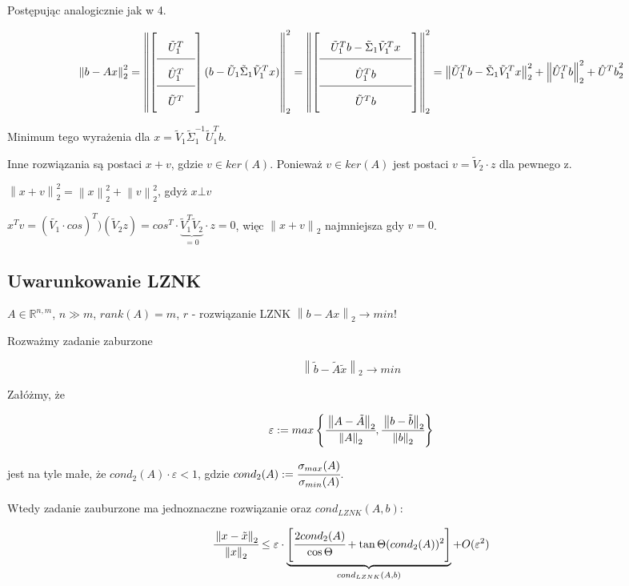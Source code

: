 \documentclass[hidelinks,a4paper]{article}
\newcommand{\RR}{\mathbb{R}}
\newcommand{\ra}{\rightarrow}
\newcommand{\norm}[1]{\left\lVert#1\right\rVert}
\begin{document}
Postępując analogicznie jak w 4.

\[\arraycolsep=1em\def\arraystretch{2}
\norm{b - Ax}_2^2 = \norm{\left[ \begin{array}{c}
\tilde{U}_1^T \\ \hline
\hat{U}_1^T \\ \hline
\tilde{U}^T 
\end{array}\right] (b - \tilde{U}_1 \tilde{\Sigma}_1 \tilde{V}_1^Tx)}_2^2 = \norm{\left[\begin{array}{c}
\tilde{U}_1^Tb - \tilde{\Sigma}_1\tilde{V}_1^Tx \\ \hline
\hat{U}_1^T b\\ \hline
\tilde{U}^T b 
\end{array}\right]}_2^2 = 
\norm{\tilde{U}_1^Tb - \tilde{\Sigma}_1\tilde{V}_1^Tx}_2^2 +  \norm{\hat{U}_1^Tb}_2^2 + {\hat{U}^Tb}_2^2
\]

Minimum tego wyrażenia dla $x = \tilde{V}_1\tilde{\Sigma}_1^{-1} \tilde{U}_1^Tb$.

Inne rozwiązania są postaci $x+v$, gdzie $v \in ker(A)$. Ponieważ $v \in ker(A)$ jest postaci $v = \tilde{V}_2 \cdot z$ dla pewnego z.

$\norm{x + v}_2^2 = \norm{x}_2^2 + \norm{v}_2^2$, gdyż $x \bot v$

$x^Tv = (\tilde{V_1} \cdot cos)^T) (\tilde{V}_2z) = cos^T \cdot \underbrace{\tilde{V}_1^T\tilde{V}_2}_{=0}\cdot z = 0$, więc $\norm{x + v}_2$ najmniejsza gdy $v = 0$.

\subsection{Uwarunkowanie LZNK}

$A \in \RR^{n,m}$, $n \gg m$, $rank(A) = m$, $r$ - rozwiązanie LZNK $\norm{b - Ax}_2 \ra min!$

Rozważmy zadanie zaburzone

\[\norm{\tilde{b} - \tilde{A}\tilde{x}}_2 \ra min\]

Załóżmy, że

\[
	\varepsilon := max \left\{ \cfrac{\norm{A - \tilde{A}}_2}{\norm{A} _2}, \cfrac{\norm{b - \tilde{b}}_2}{\norm{b}_2} \right\}
\]

jest na tyle małe, że $cond_2(A) \cdot \varepsilon < 1$, gdzie $cond_2(A) := \cfrac{\sigma_{max}(A)}{\sigma_{min}(A)}$.

Wtedy zadanie zauburzone ma jednoznaczne rozwiązanie oraz $cond_{LZNK}(A, b)$:

\[
	\cfrac{\norm{x - \tilde{x}}_2}{\norm{x}_2} \leq \varepsilon \cdot \underbrace{\left[ \cfrac{2 cond_2(A)}{\cos{\Theta}} + \tan{\Theta}(cond_2(A))^2 \right]}_{cond_{LZNK}(A, b)} + O(\varepsilon^2)
\]
\end{document}

